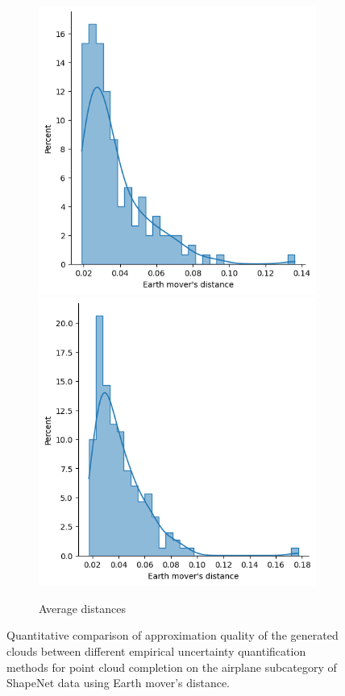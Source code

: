 \begin{figure}[htb]
\begin{subfigure}[t]{0.36\textwidth}
            \includegraphics[width=\textwidth]{figures/ensemble/matched_mean_emds.png}
            \includegraphics[width=\textwidth]{figures/imle/matched_mean_emds.png}
            \caption{Average distances}\label{fig:emdsairplane2}
          \end{subfigure}
          \caption{Quantitative comparison of approximation quality of the generated clouds between different empirical uncertainty quantification methods for point cloud completion on the airplane subcategory of ShapeNet data using Earth mover's distance.}
          \label{fig:emdsairplane}
        \end{figure}

